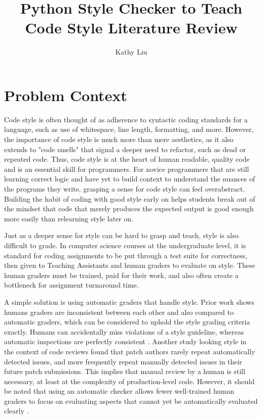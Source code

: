 \documentclass[10pt,twocolumn]{article}
\title{Python Style Checker to Teach Code Style Literature Review}
\author{Kathy Liu}
\affiliation{Occidental College}
\begin{document}
\maketitle

\section{Problem Context}
Code style is often thought of as adherence to syntactic coding standards for a language, such as use of whitespace, line length, formatting, and more. 
However, the importance of code style is much more than mere aesthetics, as it also extends to "code smells" that signal a deeper need to refactor, such as dead or repeated code. 
Thus, code style is at the heart of human readable, quality code and is an essential skill for programmers. 
For novice programmers that are still learning correct logic and have yet to build context to understand the nuances of the programs they write, grasping a sense for code style can feel overabstract. 
Building the habit of coding with good style early on helps students break out of the mindset that code that merely produces the expected output is good enough more easily than relearning style later on.

Just as a deeper sense for style can be hard to grasp and teach, style is also difficult to grade. 
In computer science courses at the undergraduate level, it is standard for coding assignments to be put through a test suite for correctness, then given to Teaching Assistants and human graders to evaluate on style. 
These human graders must be trained, paid for their work, and also often create a bottleneck for assignment turnaround time. 

A simple solution is using automatic graders that handle style. 
Prior work shows humans graders are inconsistent between each other and also compared to automatic graders, which can be considered to uphold the style grading criteria exactly. 
Humans can accidentally miss violations of a style guideline, whereas automatic inspections are perfectly consistent \cite{perretta_2019}. 
Another study looking style in the context of code reviews found that patch authors rarely repeat automatically detected issues, and more frequently repeat manually detected issues in their future patch submissions. 
This implies that manual review by a human is still necessary, at least at the complexity of production-level code. 
However, it should be noted that using an automatic checker allows fewer well-trained human graders to focus on evaluating aspects that cannot yet be automatically evaluated clearly \cite{ueda_2018}.
\end{document}
